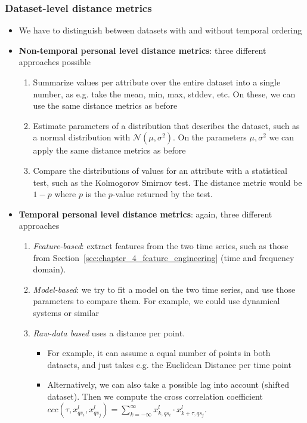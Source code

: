 \subsubsection{Dataset-level distance metrics}
\begin{itemize}
	\item We have to distinguish between datasets with and without temporal ordering
	\item \textbf{Non-temporal personal level distance metrics}: three different approaches possible
	\begin{enumerate}
		\item Summarize values per attribute over the entire dataset into a single number, as e.g. take the mean, min, max, stddev, etc. On these, we can use the same distance metrics as before
		\item Estimate parameters of a distribution that describes the dataset, such as a normal distribution with $\mathcal{N}(\mu, \sigma^2)$. On the parameters $\mu, \sigma^2$ we can apply the same distance metrics as before
		\item Compare the distributions of values for an attribute with a statistical test, such as the Kolmogorov Smirnov test. The distance metric would be $1-p$ where $p$ is the $p$-value returned by the test.
	\end{enumerate}
	\item \textbf{Temporal personal level distance metrics}: again, three different approaches
	\begin{enumerate}
		\item \textit{Feature-based}: extract features from the two time series, such as those from Section~\ref{sec:chapter_4_feature_engineering} (time and frequency domain).
		\item \textit{Model-based}: we try to fit a model on the two time series, and use those parameters to compare them. For example, we could use dynamical systems or similar
		\item \textit{Raw-data based} uses a distance per point.
		\begin{itemize}
			\item For example, it can assume a equal number of points in both datasets, and just takes e.g. the Euclidean Distance per time point
			\item Alternatively, we can also take a possible lag into account (shifted dataset). Then we compute the cross correlation coefficient $ccc(\tau, x_{qs_i}^{l}, x_{qs_j}^{l})=\sum_{k=-\infty}^{\infty} x_{k, qs_i}^{l} \cdot x_{k+\tau, qs_j}^{l}$. 

\end{itemize}
\end{enumerate}
\end{itemize}
